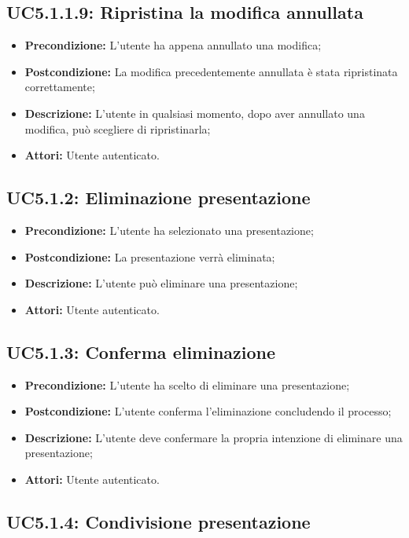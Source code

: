 \subsection{ UC5.1.1.9: Ripristina la modifica annullata}

\begin{itemize}
	\item \textbf{Precondizione:} L’utente ha appena annullato una modifica;
	\item \textbf{Postcondizione:} La modifica precedentemente annullata è stata ripristinata correttamente;
	\item \textbf{Descrizione:} L’utente in qualsiasi momento, dopo aver annullato una modifica, può scegliere di ripristinarla;
	\item \textbf{Attori:} Utente autenticato.
\end{itemize}
\subsection{ UC5.1.2: Eliminazione presentazione}

\begin{itemize}
	\item \textbf{Precondizione:} L'utente ha selezionato una presentazione;
	\item \textbf{Postcondizione:} La presentazione verrà eliminata;
	\item \textbf{Descrizione:} L'utente può eliminare una presentazione;
	\item \textbf{Attori:} Utente autenticato.
\end{itemize}
\subsection{ UC5.1.3: Conferma eliminazione }

\begin{itemize}
	\item \textbf{Precondizione:} L'utente ha scelto di eliminare una presentazione;
	\item \textbf{Postcondizione:} L'utente conferma l'eliminazione concludendo il processo;
	\item \textbf{Descrizione:} L'utente deve confermare la propria intenzione di eliminare una presentazione;
	\item \textbf{Attori:} Utente autenticato.
\end{itemize}
\subsection{ UC5.1.4: Condivisione presentazione }

